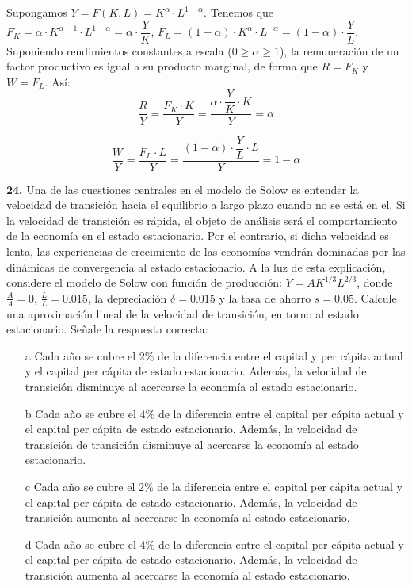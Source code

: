 \documentclass{nuevotema}
\begin{document}
Supongamos $Y=F(K,L) = K^\alpha \cdot L^{1-\alpha}$. Tenemos que $F_K=\alpha \cdot K^{\alpha-1} \cdot L^{1-\alpha} = \alpha \cdot \dfrac{Y}{K}$, $F_L=(1-\alpha) \cdot K^\alpha \cdot L^{-\alpha} = (1-\alpha) \cdot \dfrac{Y}{L}$. Suponiendo rendimientos constantes a escala ($0 \geq \alpha \geq 1$), la remuneración de un factor productivo es igual a su producto marginal, de forma que $R = F_K$ y $W = F_L$. Así:
\begin{equation}
\dfrac{R}{Y} = \dfrac{F_K\cdot K}{Y} = \dfrac{\alpha \cdot \dfrac{Y}{K}\cdot K}{Y} = \alpha
\end{equation}

\begin{equation}
	\dfrac{W}{Y} = \dfrac{F_L\cdot L}{Y} = \dfrac{(1-\alpha) \cdot \dfrac{Y}{L}\cdot L}{Y} = 1-\alpha
\end{equation}


\preguntas


\textbf{24.} Una de las cuestiones centrales en el modelo de Solow es entender la velocidad de transición hacia el equilibrio a largo plazo cuando no se está en el. Si la velocidad de transición es rápida, el objeto de análisis será el comportamiento de la economía en el estado estacionario. Por el contrario, si dicha velocidad es lenta, las experiencias de crecimiento de las economías vendrán dominadas por las dinámicas de convergencia al estado estacionario. A la luz de esta explicación, considere el modelo de Solow con función de producción: $Y = AK^{1/3} L^{2/3}$, donde $\frac{\dot{A}}{A} = 0$, $\frac{\dot{L}}{L} = 0.015$, la depreciación $\delta = 0.015$ y la tasa de ahorro $s=0.05$. Calcule una aproximación lineal de la velocidad de transición, en torno al estado estacionario. Señale la respuesta correcta:

\begin{itemize}
	\item[a] Cada año se cubre el 2\% de la diferencia entre el capital y per cápita actual y el capital per cápita de estado estacionario. Además, la velocidad de transición disminuye al acercarse la economía al estado estacionario.
	\item[b] Cada año se cubre el $4\%$ de la diferencia entre el capital per cápita actual y el capital per cápita de estado estacionario. Además, la velocidad de transición de transición disminuye al acercarse la economía al estado estacionario.
	\item[c] Cada año se cubre el $2\%$ de la diferencia entre el capital per cápita actual y el capital per cápita de estado estacionario. Además, la velocidad de transición aumenta al acercarse la economía al estado estacionario.
	\item[d] Cada año se cubre el $4\%$ de la diferencia entre el capital per cápita actual y el capital per cápita de estado estacionario. Además, la velocidad de transición aumenta al acercarse la economía al estado estacionario.
\end{itemize}
\end{document}
